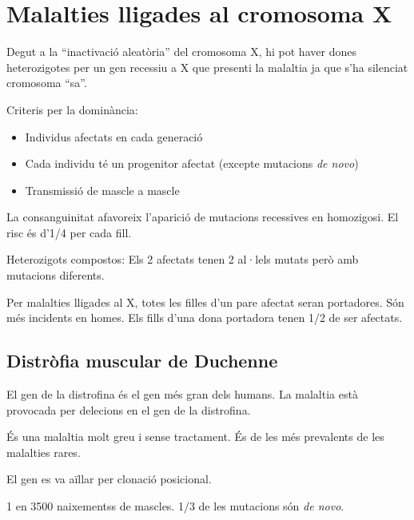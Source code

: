 \section{Malalties lligades al cromosoma X}
\label{sec:malalt-llig-al}

Degut a la ``inactivació aleatòria'' del cromosoma X, hi pot haver dones
heterozigotes per un gen recessiu a X que presenti la malaltia ja que
s'ha silenciat cromosoma ``sa''.

Criteris per la dominància:
\begin{itemize}
\item Individus afectats en cada generació
\item Cada individu té un progenitor afectat (excepte mutacions
  \textit{de novo})
\item Transmissió de mascle a mascle
\end{itemize}

La consanguinitat afavoreix l'aparició de mutacions recessives en
homozigosi. El risc és d'1/4 per cada fill.

Heterozigots compostos: Els 2 afectats tenen 2 al·lels mutats però amb
mutacions diferents.

Per malalties lligades al X, totes les filles d'un pare afectat seran
portadores. Són més incidents en homes. Els fills d'una dona portadora
tenen 1/2 de ser afectats.

\subsection{Distròfia muscular de Duchenne}
\label{sec:distr-musc-de}
El gen de la distrofina és el gen més gran dels humans. La malaltia
està provocada per delecions en el gen de la distrofina.

És una malaltia molt greu i sense tractament. És de les més prevalents
de les malalties rares.

El gen es va aïllar per clonació posicional.


1 en 3500 naixementss de mascles. 1/3 de les mutacions són \textit{de novo}.